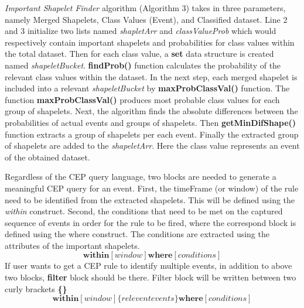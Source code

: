 \documentclass[conference]{IEEEtran}  %
\begin{document}
\textit{Important Shapelet Finder} algorithm (Algorithm 3) takes in three parameters, namely Merged Shapelets, Class Values (Event), and Classified dataset. Line 2 and 3 initialize two lists named \textit{shapletArr} and \textit{classValueProb} which would respectively contain important shapelets and probabilities for class values within the total dataset. Then for each class value, a \textbf{set} data structure is created named \textit{shapeletBucket}. \textbf{findProb()} function calculates the probability of the relevant class values within the dataset. In the next step, each merged shapelet is included into a relevant \textit{shapeletBucket} by \textbf{maxProbClassVal()} function. The function \textbf{maxProbClassVal()} produces most probable class values for each group of shapelets. Next, the algorithm finds the absolute differences between the probabilities of actual events and groups of shapelets. Then \textbf{getMinDifShape()} function extracts a group of shapelets per each event. Finally the extracted group of shapelets are added to the \textit{shapeletArr}. Here the class value represents an event of the obtained dataset.


Regardless of the CEP query language, two blocks are needed to generate a meaningful CEP query for an event. First, the timeFrame (or window) of the rule need to be identified from the extracted shapelets. This will be defined using the \textit{within} construct. Second, the conditions that need to be met on the captured sequence of events in order for the rule to be fired, where the correspond block is defined using the where construct. The conditions are extracted using the attributes of the important shapelets.
%
%
%
%
\begin{equation}
\textbf{within}[window] \textbf{where}[conditions]
\end{equation}
If user wants to get a CEP rule to identify multiple events, in addition to above two blocks, \textbf{filter} block should be there. Filter block will be written between two curly brackets \textbf{\{\}}
\begin{equation}
\textbf{within}[window] \{relevent events\} \textbf{where}[conditions]
\end{equation}
\end{document}
